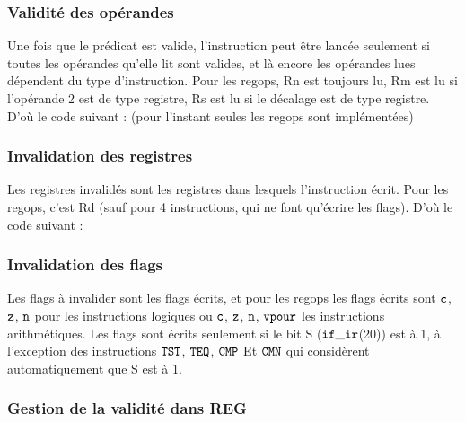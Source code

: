 \documentclass{article}
\begin{document}


\subsubsection{Validité des opérandes}

Une fois que le prédicat est valide, l'instruction peut être lancée seulement si toutes les opérandes
qu'elle lit sont valides, et là encore les opérandes lues dépendent du type d'instruction.
Pour les regops, Rn est toujours lu, Rm est lu si l'opérande 2 est de type registre,
Rs est lu si le décalage est de type registre. D'où le code suivant :
(pour l'instant seules les regops sont implémentées)



\subsubsection{Invalidation des registres}

Les registres invalidés sont les registres dans lesquels l'instruction écrit.
Pour les regops, c'est Rd (sauf pour 4 instructions, qui ne font qu'écrire les flags).
D'où le code suivant :



\subsubsection{Invalidation des flags}

Les flags à invalider sont les flags écrits, et pour les regops les flags écrits
sont $\tt{c}$, $\tt{z}$, $\tt{n}$ pour les instructions logiques
ou $\tt{c}$, $\tt{z}$, $\tt{n}$, $\tt{v pour}$ les
instructions arithmétiques.
Les flags sont écrits seulement si le bit S ($\tt{if\_ir}$(20)) est à 1, à l'exception des instructions
$\tt{TST}$, $\tt{TEQ}$, $\tt{CMP}$ Et $\tt{CMN}$ qui considèrent
automatiquement que S est à 1.



\subsubsection{Gestion de la validité dans REG}
\end{document}
